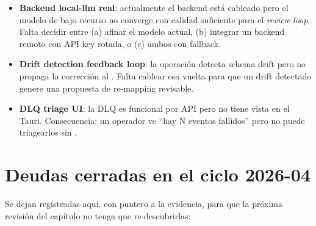 \begin{itemize}
    \item \textbf{Backend local-llm real}: actualmente el backend
     está cableado pero el modelo de bajo recurso no
    converge con calidad suficiente para el \emph{review loop}.
    Falta decidir entre (a) afinar el modelo actual, (b) integrar
    un backend remoto con API key rotada, o (c) ambos con fallback.
    \item \textbf{Drift detection feedback loop}: la operación
     detecta schema drift pero no propaga la
    corrección al . Falta cablear esa vuelta
    para que un drift detectado genere una propuesta de re-mapping
    revisable.
    \item \textbf{DLQ triage UI}: la DLQ es funcional por API pero
    no tiene vista en el Tauri. Consecuencia: un operador ve
    ``hay N eventos fallidos'' pero no puede triagearlos sin
    .
\end{itemize}

\section{Deudas cerradas en el ciclo 2026-04}

Se dejan registradas aquí, con puntero a la evidencia, para que la
próxima revisión del capítulo no tenga que re-descubrirlas:

